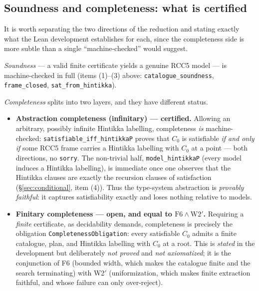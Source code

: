 \documentclass[11pt]{article}
\newcommand{\code}[1]{\texttt{#1}}
\theoremstyle{plain}
\theoremstyle{definition}
\begin{document}
\subsection{Soundness and completeness: what is certified}\label{sec:certstatus}

It is worth separating the two directions of the reduction and stating
exactly what the Lean development establishes for each, since the
completeness side is more subtle than a single ``machine-checked''
would suggest.

\emph{Soundness} --- a valid finite certificate yields a genuine RCC5
model --- is machine-checked in full (items (1)--(3) above:
\code{catalogue\_soundness}, \code{frame\_closed},
\code{sat\_from\_hintikka}).

\emph{Completeness} splits into two layers, and they have different
status.
\begin{itemize}[leftmargin=1.5em]
\item \textbf{Abstraction completeness (infinitary) --- certified.}
Allowing an arbitrary, possibly infinite Hintikka labelling,
completeness \emph{is} machine-checked: \code{satisfiable\_iff\_hintikkaP}
proves that $C_0$ is satisfiable \emph{if and only if} some RCC5 frame
carries a Hintikka labelling with $C_0$ at a point --- both directions,
no \code{sorry}. The non-trivial half, \code{model\_hintikkaP} (every
model induces a Hintikka labelling), is immediate once one observes that
the Hintikka clauses are exactly the recursion clauses of satisfaction
(\S\ref{sec:conditional}, item (4)). Thus the type-system abstraction is
\emph{provably faithful}: it captures satisfiability exactly and loses
nothing relative to models.
\item \textbf{Finitary completeness --- open, and equal to
$\mathrm{F6}\wedge\mathrm{W2}'$.} Requiring a \emph{finite} certificate,
as decidability demands, completeness is precisely the obligation
\code{CompletenessObligation}: every satisfiable $C_0$ admits a finite
catalogue, plan, and Hintikka labelling with $C_0$ at a root. This is
\emph{stated} in the development but deliberately \emph{not proved} and
\emph{not axiomatized}; it is the conjunction of F6 (bounded width, which
makes the catalogue finite and the search terminating) with W2$'$
(uniformization, which makes finite extraction faithful, and whose
failure can only over-reject).
\end{itemize}
\end{document}
